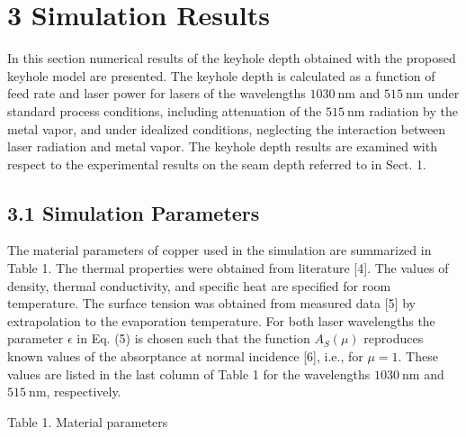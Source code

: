 \documentclass[10pt]{article}
\begin{document}
\section*{3 Simulation Results}
In this section numerical results of the keyhole depth obtained with the proposed keyhole model are presented. The keyhole depth is calculated as a function of feed rate and laser power for lasers of the wavelengths $1030 \mathrm{~nm}$ and $515 \mathrm{~nm}$ under standard process conditions, including attenuation of the $515 \mathrm{~nm}$ radiation by the metal vapor, and under idealized conditions, neglecting the interaction between laser radiation and metal vapor. The keyhole depth results are examined with respect to the experimental results on the seam depth referred to in Sect. 1.

\subsection*{3.1 Simulation Parameters}
The material parameters of copper used in the simulation are summarized in Table 1. The thermal properties were obtained from literature [4]. The values of density, thermal conductivity, and specific heat are specified for room temperature. The surface tension was obtained from measured data [5] by extrapolation to the evaporation temperature. For both laser wavelengths the parameter $\epsilon$ in Eq. (5) is chosen such that the function $A_{S}(\mu)$ reproduces known values of the absorptance at normal incidence [6], i.e., for $\mu=1$. These values are listed in the last column of Table 1 for the wavelengths $1030 \mathrm{~nm}$ and $515 \mathrm{~nm}$, respectively.

Table 1. Material parameters
\end{document}
